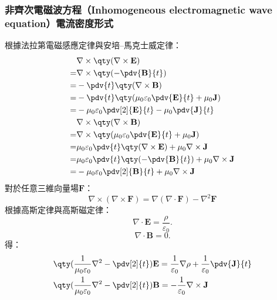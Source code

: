 \documentclass[a4paper,12pt]{report}
\begin{document}
\begin{itemize}
\subsubsection{非齊次電磁波方程（Inhomogeneous electromagnetic wave equation）電流密度形式}
根據法拉第電磁感應定律與安培–馬克士威定律：
\[\begin{aligned}
& \nabla\times\qty(\nabla\times\mathbf{E})\\
=& \nabla\times\qty(-\pdv{\mathbf{B}}{t})\\
=& -\pdv{t}\qty(\nabla\times\mathbf{B})\\
=& -\pdv{t}\qty(\mu_0\varepsilon_0\pdv{\mathbf{E}}{t}+\mu_0\mathbf{J})\\
=& -\mu_0\varepsilon_0\pdv[2]{\mathbf{E}}{t}-\mu_0\pdv{\mathbf{J}}{t}\\
& \nabla\times\qty(\nabla\times\mathbf{B})\\
=& \nabla\times\qty(\mu_0\varepsilon_0\pdv{\mathbf{E}}{t}+\mu_0\mathbf{J})\\
=& \mu_0\varepsilon_0\pdv{t}\qty(\nabla\times\mathbf{E})+\mu_0\nabla\times\mathbf{J}\\
=& \mu_0\varepsilon_0\pdv{t}\qty(-\pdv{\mathbf{B}}{t})+\mu_0\nabla\times\mathbf{J}\\
=& -\mu_0\varepsilon_0\pdv[2]{\mathbf{B}}{t}+\mu_0\nabla\times\mathbf{J}
\end{aligned}\]
對於任意三維向量場$\mathbf{F}$：
\[\nabla\times\left(\nabla\times\mathbf{F}\right)=\nabla\left(\nabla\cdot\mathbf{F}\right)-\nabla^2\mathbf{F}\]
根據高斯定律與高斯磁定律：
\[\nabla\cdot\mathbf{E}=\frac{\rho}{\varepsilon_0}.\]
\[\nabla\cdot\mathbf{B}=0.\]
得：
\[\begin{aligned}
& \qty(\frac{1}{\mu_0\varepsilon_0}\nabla^2-\pdv[2]{t})\mathbf{E}=\frac{1}{\varepsilon_0}\nabla\rho+\frac{1}{\varepsilon_0}\pdv{\mathbf{J}}{t}\\
& \qty(\frac{1}{\mu_0\varepsilon_0}\nabla^2-\pdv[2]{t})\mathbf{B}=-\frac{1}{\varepsilon_0}\nabla\times\mathbf{J}
\end{aligned}\]

\end{itemize}
\end{document}
